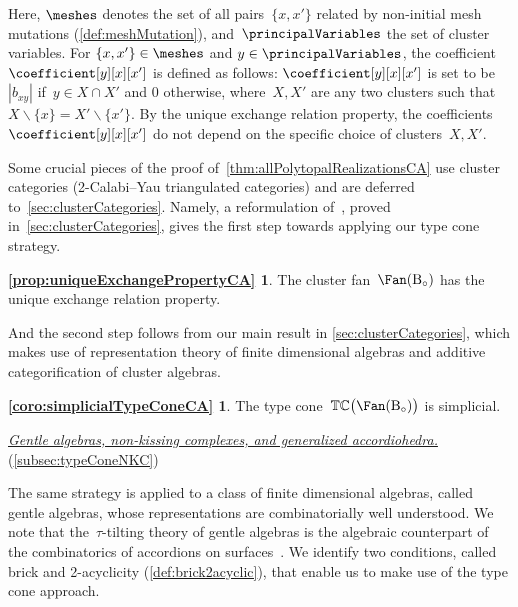 \documentclass{amsart}
\theoremstyle{definition}
\newcommand{\ssm}{\smallsetminus} %
\newcommand{\para}[1]{\medskip\noindent\uline{\textit{#1.}}} %
\newcommand{\typeCone}{\mathbb{TC}} %
\newcommand{\B}{\mathrm{B}} %
\begin{document}
Here, $\meshes$ denotes the set of all pairs~$\{x,x'\}$ related by non-initial mesh mutations (\cref{def:meshMutation}), and~$\principalVariables$ the set of cluster variables.
For $\{x,x'\} \in \meshes$ and $y \in \principalVariables$, the coefficient $\coefficient[y][x][x']$ is defined as follows: $\coefficient[y][x][x']$ is set to be~$|b_{xy}|$ if~$y\in X\cap X'$ and $0$ otherwise, where~$X,X'$ are any two clusters such that~$X \ssm \{x\} = X' \ssm \{x'\}$. By the unique exchange relation property, the coefficients~$\coefficient[y][x][x']$ do not depend on the specific choice of clusters~$X,X'$.

\medskip

Some crucial pieces of the proof of~\cref{thm:allPolytopalRealizationsCA} use cluster categories (2-Calabi--Yau triangulated categories) and are deferred to~\cref{sec:clusterCategories}. Namely, a reformulation of~\cite[Thm.~7.5]{BuanMarshReinekeReitenTodorov}, proved in~\cref{sec:clusterCategories}, gives the first step towards applying our type cone strategy.

\newtheorem*{prop:uniqueExchangePropertyCA}{\cref{prop:uniqueExchangePropertyCA}}
\begin{prop:uniqueExchangePropertyCA}
The cluster fan~$\Fan(\B_\circ)$ has the unique exchange relation property.
\end{prop:uniqueExchangePropertyCA}

And the second step follows from our main result in \cref{sec:clusterCategories}, which makes use of representation theory of finite dimensional algebras and additive categorification of cluster algebras.

\newtheorem*{coro:simplicialTypeConeCA}{\cref{coro:simplicialTypeConeCA}}
\begin{coro:simplicialTypeConeCA}
The type cone~$\typeCone \big( \Fan(\B_\circ) \big)$ is simplicial.
\end{coro:simplicialTypeConeCA}

\para{Gentle algebras, non-kissing complexes, and generalized accordiohedra}
(\cref{subsec:typeConeNKC})

\noindent
The same strategy is applied to a class of finite dimensional algebras, called gentle algebras, whose representations are combinatorially well understood.
We note that the~$\tau$-tilting theory of gentle algebras is the algebraic counterpart of the combinatorics of accordions on surfaces~\cite{PaluPilaudPlamondon-nonkissing,BrustleDouvilleMousavandThomasYildirim,PaluPilaudPlamondon-surfaces}.
We identify two conditions, called brick and 2-acyclicity (\cref{def:brick2acyclic}), that enable us to make use of the type cone approach.
\end{document}
